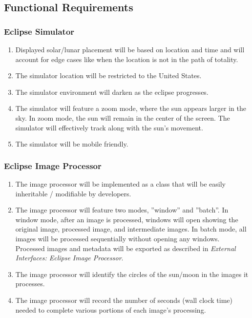 \documentclass[10pt, onecolumn, draftclsnofoot, letterpaper, compsoc]{IEEEtran}
\begin{document}
\subsection{Functional Requirements}

\subsubsection{Eclipse Simulator}
	\begin{enumerate}
		\item Displayed solar/lunar placement will be based on location and
		time and will account for edge cases like when the location is not in
		the path of totality.

		\item The simulator location will be restricted to the United States.

		\item The simulator environment will darken as the eclipse progresses.

        \item The simulator will feature a zoom mode, where the sun appears larger
        in the sky. In zoom mode, the sun will remain in the center of the screen.
        The simulator will effectively track along with the sun's movement.

        \item The simulator will be mobile friendly.
	\end{enumerate}

\subsubsection{Eclipse Image Processor}
	\begin{enumerate}
		\item The image processor will be implemented as a class that will be easily
        inheritable / modifiable by developers.

        \item The image processor will feature two modes, ''window'' and ''batch''. In window
        mode, after an image is processed, windows will open showing the original image,
        processed image, and intermediate images. In batch mode, all images will be processed
        sequentially without opening any windows. Processed images and metadata will be exported
        as described in \textit{External Interfaces: Eclipse Image Processor}.

        \item The image processor will identify the circles of the sun/moon in the images it processes.

        \item The image processor will record the number of seconds (wall clock time) needed to
        complete various portions of each image's processing.

	\end{enumerate}
\end{document}
